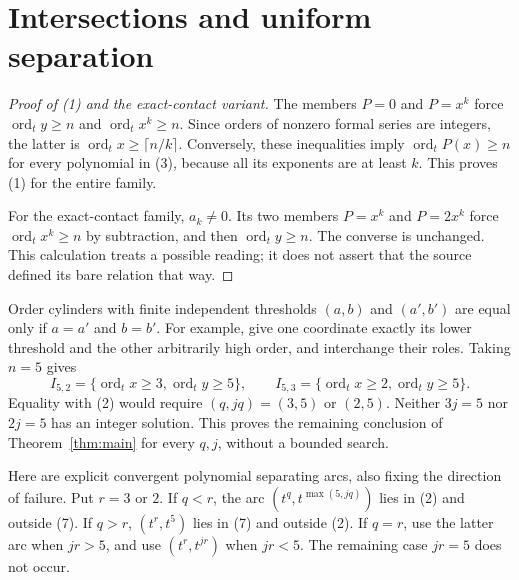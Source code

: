 \documentclass[11pt]{article}
\newcommand{\ord}{\operatorname{ord}_t}
\begin{document}
\section{Intersections and uniform separation}

\begin{proof}[Proof of (1) and the exact-contact variant]
The members \(P=0\) and \(P=x^k\) force
\(\ord y\geq n\) and \(\ord x^k\geq n\). Since orders of nonzero
formal series are integers, the latter is
\(\ord x\geq\lceil n/k\rceil\).
Conversely, these inequalities imply \(\ord P(x)\geq n\) for every
polynomial in (3), because all its exponents are at least \(k\).
This proves (1) for the entire family.

For the exact-contact family, \(a_k\ne0\). Its two members \(P=x^k\)
and \(P=2x^k\) force \(\ord x^k\geq n\) by subtraction, and then
\(\ord y\geq n\). The converse is unchanged. This calculation treats
a possible reading; it does not assert that the source defined its bare
relation that way.
\end{proof}

Order cylinders with finite independent thresholds \((a,b)\) and
\((a',b')\) are equal only if \(a=a'\) and \(b=b'\).
For example, give one coordinate exactly its lower threshold and the
other arbitrarily high order, and interchange their roles.
Taking \(n=5\) gives
\[
 I_{5,2}=\{\ord x\geq3,\ord y\geq5\},\qquad
 I_{5,3}=\{\ord x\geq2,\ord y\geq5\}.                     \tag{7}
\]
Equality with (2) would require \((q,jq)=(3,5)\) or \((2,5)\).
Neither \(3j=5\) nor \(2j=5\) has an integer solution. This proves
the remaining conclusion of Theorem~\ref{thm:main} for every \(q,j\),
without a bounded search.

Here are explicit convergent polynomial separating arcs, also fixing
the direction of failure. Put \(r=3\) or \(2\).
If \(q<r\), the arc
\((t^q,t^{\max(5,jq)})\) lies in (2) and outside (7).
If \(q>r\), \((t^r,t^5)\) lies in (7) and outside (2).
If \(q=r\), use the latter arc when \(jr>5\), and use
\((t^r,t^{jr})\) when \(jr<5\). The remaining case \(jr=5\)
does not occur.
\end{document}
